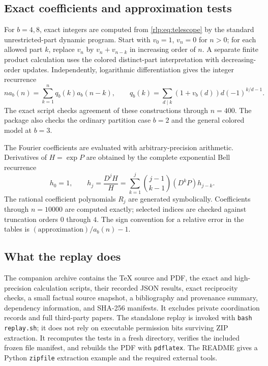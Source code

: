 \documentclass[11pt,letterpaper]{article}
\numberwithin{equation}{section}
\theoremstyle{remark}\newtheorem{remark}[theorem]{Remark}
\begin{document}
\subsection{Exact coefficients and approximation tests}
For $b=4,8$, exact integers are computed from \eqref{rlp:eq:telescope} by the standard unrestricted-part dynamic program. Start with $v_0=1$, $v_n=0$ for $n>0$; for each allowed part $k$, replace $v_n$ by $v_n+v_{n-k}$ in increasing order of $n$. A separate finite product calculation uses the colored distinct-part interpretation with decreasing-order updates. Independently, logarithmic differentiation gives the integer recurrence
\[
 n a_b(n)=\sum_{k=1}^n q_b(k)a_b(n-k),\qquad
 q_b(k)=\sum_{d\mid k}(1+v_b(d))d(-1)^{k/d-1}.
\]
The exact script checks agreement of these constructions through $n=400$. The package also checks the ordinary partition case $b=2$ and the general colored model at $b=3$.

The Fourier coefficients are evaluated with arbitrary-precision arithmetic. Derivatives of $H=\exp P$ are obtained by the complete exponential Bell recurrence
\[
 h_0=1,\qquad
 h_j=\frac{D^jH}{H}
 =\sum_{k=1}^j\binom{j-1}{k-1}(D^kP)h_{j-k}.
\]
The rational coefficient polynomials $R_j$ are generated symbolically. Coefficients through $n=10000$ are computed exactly; selected indices are checked against truncation orders $0$ through $4$. The sign convention for a relative error in the tables is $(\text{approximation})/a_b(n)-1$.

\begingroup
\makeatletter
\let\rlpOrigLabel\label
\let\rlpOrigEqref\eqref
\let\rlpOrigFloatboxreset\@floatboxreset
\def\@floatboxreset{\rlpOrigFloatboxreset\def\label##1{\rlpOrigLabel{rlp:##1}}}%
\makeatother
\renewcommand{\label}[1]{\rlpOrigLabel{rlp:#1}}%
\renewcommand{\eqref}[1]{\rlpOrigEqref{rlp:#1}}%

\endgroup

\subsection{What the replay does}\label{rlp:sec:replay}
The companion archive contains the TeX source and PDF, the exact and high-precision calculation scripts, their recorded JSON results, exact reciprocity checks, a small factual source snapshot, a bibliography and provenance summary, dependency information, and SHA-256 manifests. It excludes private coordination records and full third-party papers. The standalone replay is invoked with \texttt{bash replay.sh}; it does not rely on executable permission bits surviving ZIP extraction. It recomputes the tests in a fresh directory, verifies the included frozen file manifest, and rebuilds the PDF with \texttt{pdflatex}. The README gives a Python \texttt{zipfile} extraction example and the required external tools.
\end{document}
